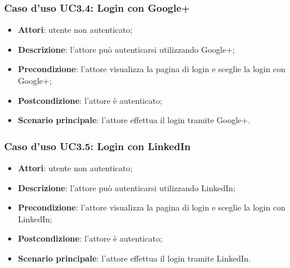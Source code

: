 \subsubsection{Caso d'uso UC3.4: Login con Google+}
\begin{itemize}
	\item \textbf{Attori}: utente non autenticato;
	\item \textbf{Descrizione}: l'attore può autenticarsi utilizzando Google+;
	\item \textbf{Precondizione}: l'attore visualizza la pagina di login e sceglie la login con Google+;
	\item \textbf{Postcondizione}: l'attore è autenticato;
	\item \textbf{Scenario principale}: l'attore effettua il login tramite Google+.
\end{itemize}
\subsubsection{Caso d'uso UC3.5: Login con LinkedIn}
\begin{itemize}
	\item \textbf{Attori}: utente non autenticato;
	\item \textbf{Descrizione}: l'attore può autenticarsi utilizzando LinkedIn;
	\item \textbf{Precondizione}: l'attore visualizza la pagina di login e sceglie la login con LinkedIn;
	\item \textbf{Postcondizione}: l'attore è autenticato;
	\item \textbf{Scenario principale}: l'attore effettua il login tramite LinkedIn.
\end{itemize}